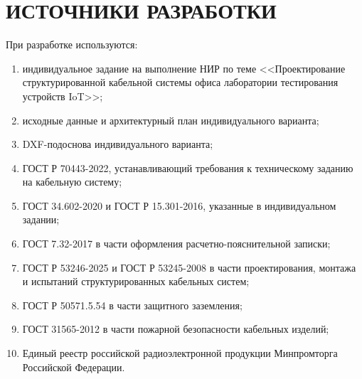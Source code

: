 \documentclass[a4paper,oneside,14pt]{extreport}
\begin{document}
\chapter{ИСТОЧНИКИ РАЗРАБОТКИ}

При разработке используются:

\begin{enumerate}[label=\asbuk*)]
    \item индивидуальное задание на выполнение НИР по теме <<Проектирование структурированной кабельной системы офиса лаборатории тестирования устройств IoT>>;
    \item исходные данные и архитектурный план индивидуального варианта;
    \item DXF-подоснова индивидуального варианта;
    \item ГОСТ Р 70443-2022, устанавливающий требования к техническому заданию на кабельную систему;
    \item ГОСТ 34.602-2020 и ГОСТ Р 15.301-2016, указанные в индивидуальном задании;
    \item ГОСТ 7.32-2017 в части оформления расчетно-пояснительной записки;
    \item ГОСТ Р 53246-2025 и ГОСТ Р 53245-2008 в части проектирования, монтажа и испытаний структурированных кабельных систем;
    \item ГОСТ Р 50571.5.54 в части защитного заземления;
    \item ГОСТ 31565-2012 в части пожарной безопасности кабельных изделий;
    \item Единый реестр российской радиоэлектронной продукции Минпромторга Российской Федерации.
\end{enumerate}
\end{document}
